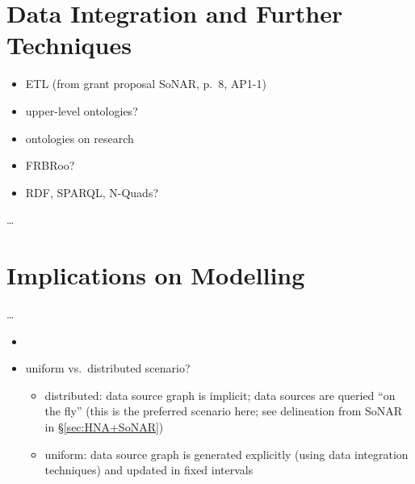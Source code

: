 \section{Data Integration and Further Techniques}
\label{sec:data_integration}

\begin{itemize}
  \item 
    ETL (from grant proposal \gls{SoNAR}, p.~8, AP1-1)
  \item
    upper-level ontologies?
  \item 
    ontologies on research
  \item
    FRBRoo?
  \item
    \gls{RDF}, SPARQL, N-Quads?
\end{itemize}


\dots

\section{Implications on Modelling}
\label{sec:implications_on_modelling}

\dots


\begin{itemize}
  \item
  \item 
    uniform vs.\ distributed scenario?
    \begin{itemize}
      \item
        distributed: data source graph is implicit; data sources are queried \enquote{on the fly}
        (this is the preferred scenario here; see delineation from SoNAR in §\ref{sec:HNA+SoNAR})
      \item
        uniform: data source graph is generated explicitly (using data integration techniques)
        and updated in fixed intervals
    \end{itemize}
\end{itemize}


